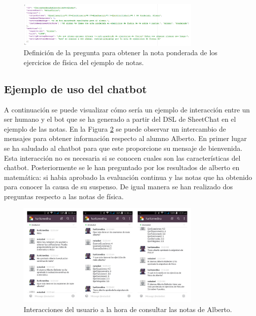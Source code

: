 \begin{figure}[htb]
	\centering
	\includegraphics[width=0.8\textwidth]{./figs/DSLNotasPonderada.png}
	\caption{Definición de la pregunta para obtener la nota ponderada de los ejercicios de física del ejemplo de notas.}
	\label{fig:DSLNotasPonderada}
\end{figure}

\subsection{Ejemplo de uso del chatbot}

A continuación se puede visualizar cómo sería un ejemplo de interacción entre un ser humano y el bot que se ha generado a partir del DSL de SheetChat en el ejemplo de las notas. En la Figura \ref{fig:EjecucionNotas1} se puede observar un intercambio de mensajes para obtener información respecto al alumno Alberto. En primer lugar se ha saludado al chatbot para que este proporcione su mensaje de bienvenida. Esta interacción no es necesaria si se conocen cuales son las características del chatbot. Posteriormente se le han preguntado por los resultados de alberto en matemática: si habia aprobado la evaluación continua y las notas que ha obtenido para conocer la causa de su suspenso. De igual manera se han realizado dos preguntas respecto a las notas de física.

\begin{figure}[htb]
	\centering
	\includegraphics[width=0.8\textwidth]{./figs/ejecucionNotas1.png}
	\caption{Interacciones del usuario a la hora de consultar las notas de Alberto.}
	\label{fig:EjecucionNotas1}
\end{figure}

